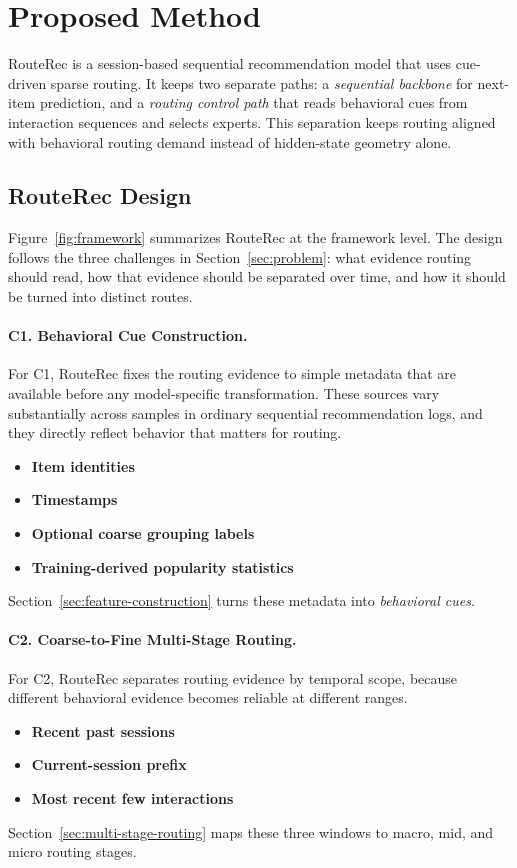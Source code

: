 \documentclass[sigconf,review,anonymous]{acmart}
\begin{document}
\section{Proposed Method}
\label{sec:method}

RouteRec is a session-based sequential recommendation model that uses cue-driven sparse routing. It keeps two separate paths: a \emph{sequential backbone} for next-item prediction, and a \emph{routing control path} that reads behavioral cues from interaction sequences and selects experts. This separation keeps routing aligned with behavioral routing demand instead of hidden-state geometry alone.

\subsection{RouteRec Design}
\label{sec:routerec-overview}

Figure~\ref{fig:framework} summarizes RouteRec at the framework level. The design follows the three challenges in Section~\ref{sec:problem}: what evidence routing should read, how that evidence should be separated over time, and how it should be turned into distinct routes.

\paragraph{\textbf{C1. Behavioral Cue Construction.}}
For C1, RouteRec fixes the routing evidence to simple metadata that are available before any model-specific transformation. These sources vary substantially across samples in ordinary sequential recommendation logs, and they directly reflect behavior that matters for routing.
\begin{itemize}
  \item \textbf{Item identities}
  \item \textbf{Timestamps}
  \item \textbf{Optional coarse grouping labels}
  \item \textbf{Training-derived popularity statistics}
\end{itemize}
Section~\ref{sec:feature-construction} turns these metadata into \emph{behavioral cues}.

\paragraph{\textbf{C2. Coarse-to-Fine Multi-Stage Routing.}}
For C2, RouteRec separates routing evidence by temporal scope, because different behavioral evidence becomes reliable at different ranges.
\begin{itemize}
  \item \textbf{Recent past sessions}
  \item \textbf{Current-session prefix}
  \item \textbf{Most recent few interactions}
\end{itemize}
Section~\ref{sec:multi-stage-routing} maps these three windows to macro, mid, and micro routing stages.
\end{document}
